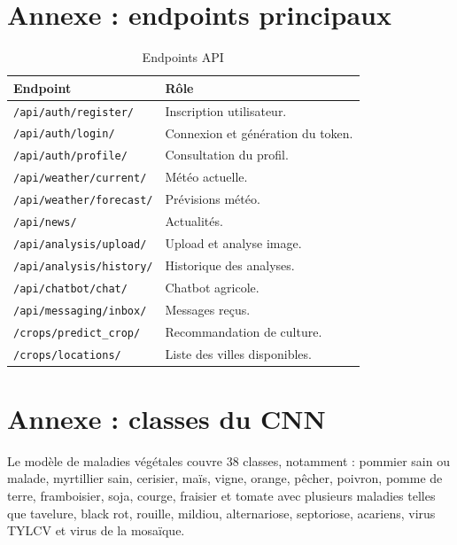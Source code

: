 \documentclass[12pt,a4paper]{report}
\begin{document}
\chapter{Annexe : endpoints principaux}
\begin{longtable}{p{5cm}p{9cm}}
\caption{Endpoints API}\\
\toprule
\textbf{Endpoint} & \textbf{Rôle} \\
\midrule
\texttt{/api/auth/register/} & Inscription utilisateur. \\
\texttt{/api/auth/login/} & Connexion et génération du token. \\
\texttt{/api/auth/profile/} & Consultation du profil. \\
\texttt{/api/weather/current/} & Météo actuelle. \\
\texttt{/api/weather/forecast/} & Prévisions météo. \\
\texttt{/api/news/} & Actualités. \\
\texttt{/api/analysis/upload/} & Upload et analyse image. \\
\texttt{/api/analysis/history/} & Historique des analyses. \\
\texttt{/api/chatbot/chat/} & Chatbot agricole. \\
\texttt{/api/messaging/inbox/} & Messages reçus. \\
\texttt{/crops/predict\_crop/} & Recommandation de culture. \\
\texttt{/crops/locations/} & Liste des villes disponibles. \\
\bottomrule
\end{longtable}

\chapter{Annexe : classes du CNN}
Le modèle de maladies végétales couvre 38 classes, notamment : pommier sain ou malade, myrtillier sain, cerisier, maïs, vigne, orange, pêcher, poivron, pomme de terre, framboisier, soja, courge, fraisier et tomate avec plusieurs maladies telles que tavelure, black rot, rouille, mildiou, alternariose, septoriose, acariens, virus TYLCV et virus de la mosaïque.
\end{document}
